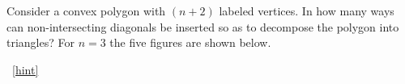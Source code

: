 \documentclass{book}
\begin{document}
\setcounter{project}{176}
\addtocounter{project}{-1}
\begin{activity}[]\label{act-traingulations}
\hypertarget{p-1053}{}%
Consider a convex polygon with \((n+2)\) labeled vertices.  In how many ways can non-intersecting diagonals be inserted so as to decompose the polygon into triangles? For \(n = 3\) the five figures are shown below.%
\begin{sidebyside}{5}{0.025}{0.025}{0.05}
\begin{sbspanel}{0.15}
\end{sbspanel}
\begin{sbspanel}{0.15}
\end{sbspanel}
\begin{sbspanel}{0.15}
\end{sbspanel}
\begin{sbspanel}{0.15}
\end{sbspanel}
\begin{sbspanel}{0.15}
\end{sbspanel}
\end{sidebyside}
~\hfill{\tiny\hyperlink{a-176}{[hint]}\hypertarget{q-176}{}}\end{activity}
\end{document}
